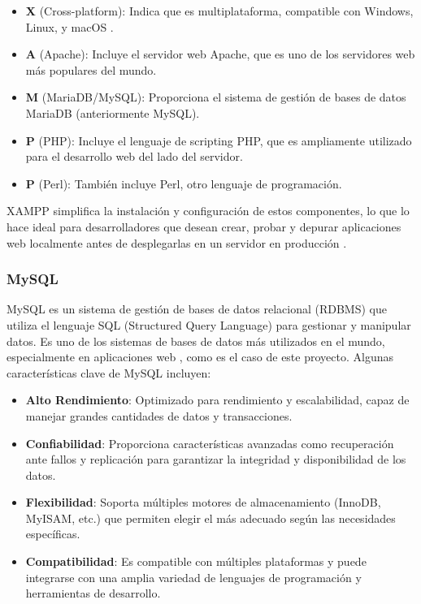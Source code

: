 \begin{itemize}
    \item \textbf{X} (Cross-platform): Indica que es multiplataforma, compatible con Windows, Linux, y macOS \cite{xampp}.
    \item \textbf{A} (Apache): Incluye el servidor web Apache, que es uno de los servidores web más populares del mundo.
    \item \textbf{M} (MariaDB/MySQL): Proporciona el sistema de gestión de bases de datos MariaDB (anteriormente MySQL).
    \item \textbf{P} (PHP): Incluye el lenguaje de scripting PHP, que es ampliamente utilizado para el desarrollo web del lado del servidor.
    \item \textbf{P} (Perl): También incluye Perl, otro lenguaje de programación.
\end{itemize}

XAMPP simplifica la instalación y configuración de estos componentes, lo que lo hace ideal para desarrolladores que desean crear, probar y depurar aplicaciones web localmente antes de desplegarlas en un servidor en producción \cite{xamppdocs}.

\subsubsection{MySQL}

MySQL es un sistema de gestión de bases de datos relacional (RDBMS) que utiliza el lenguaje SQL (Structured Query Language) para gestionar y manipular datos. Es uno de los sistemas de bases de datos más utilizados en el mundo, especialmente en aplicaciones web \cite{mysql}, como es el caso de este proyecto. Algunas características clave de MySQL incluyen:

\begin{itemize}
    \item \textbf{Alto Rendimiento}: Optimizado para rendimiento y escalabilidad, capaz de manejar grandes cantidades de datos y transacciones.
    \item \textbf{Confiabilidad}: Proporciona características avanzadas como recuperación ante fallos y replicación para garantizar la integridad y disponibilidad de los datos.
    \item \textbf{Flexibilidad}: Soporta múltiples motores de almacenamiento (InnoDB, MyISAM, etc.) que permiten elegir el más adecuado según las necesidades específicas.
    \item \textbf{Compatibilidad}: Es compatible con múltiples plataformas y puede integrarse con una amplia variedad de lenguajes de programación y herramientas de desarrollo.
\end{itemize}

